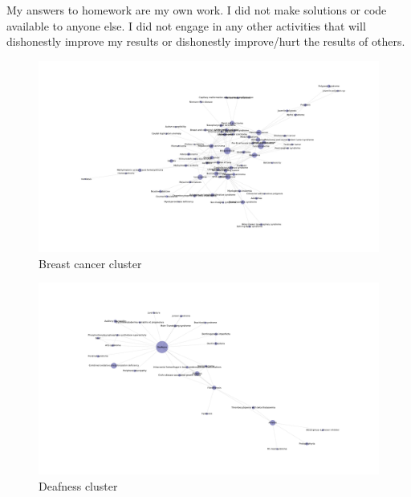 \documentclass[a4paper,11pt]{article}
\begin{document}

My answers to homework are my own work. I did not make solutions or code available to anyone else. I did not engage in any other activities that will dishonestly improve my results or dishonestly improve/hurt the results of others.
\begin{figure}[htbp]
    \begin{center}
        \includegraphics[scale=0.25]{img/breasCancer.pdf}
        \caption{Breast cancer cluster}
        \label{breasCancer}
    \end{center}
\end{figure}

\begin{figure}[htbp]
    \begin{center}
        \includegraphics[scale=0.25]{img/defness.pdf}
        \caption{Deafness cluster}
        \label{defness}
    \end{center}
\end{figure}
\end{document}
